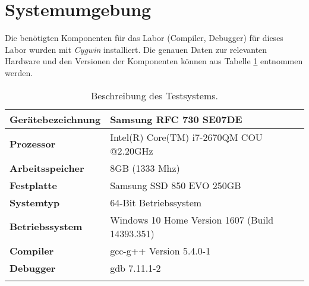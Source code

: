\section{Systemumgebung}

Die benötigten Komponenten für das Labor (Compiler, Debugger) für dieses Labor wurden mit \textit{Cygwin} installiert. Die genauen Daten zur relevanten Hardware und den Versionen der Komponenten können aus Tabelle \ref{tab:systemenv} entnommen werden.

\begin{center}
	\begin{longtable}{|p{5cm}|p{9cm}|}
		\hline
		
		\textbf{Gerätebezeichnung} & Samsung RFC 730 SE07DE\\
		\hline
		
		\textbf{Prozessor} & Intel(R) Core(TM) i7-2670QM COU @2.20GHz\\
		\hline
		
		\textbf{Arbeitsspeicher} & 8GB (1333 Mhz)\\
		\hline
		
		\textbf{Festplatte} & Samsung SSD 850 EVO 250GB\\
		\hline
		
		\textbf{Systemtyp} & 64-Bit Betriebssystem\\
		\hline
		
		\textbf{Betriebssystem} & Windows 10 Home Version 1607 (Build 14393.351)\\
		\hline
		
		\textbf{Compiler} & gcc-g++ Version 5.4.0-1\\
		\hline
		
		\textbf{Debugger} & gdb 7.11.1-2 \\
		\hline
		
		\caption{Beschreibung des Testsystems.}
		\label{tab:systemenv}
	\end{longtable}
\end{center}